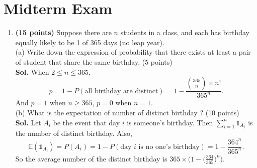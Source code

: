 \section*{Midterm Exam}
\begin{enumerate}
    \item \textbf{(15 points)} Suppose there are \(n\) students in a class, and each has birthday equally likely to be 1 of 365 days (no leap year).\\
    (a) Write down the expression of probability that there exists at least a pair of student that share the same birthday. (5 points)\\
    \textbf{Sol.} When $2\leq n\leq 365$,
\begin{equation*}    
    p=1-P(\text{all birthday are distinct})=1-\frac{\binom{365}{n}\times n!}{365^n}.
    \end{equation*}
    And $p=1$ when $n\geq 365$, $p=0$ when $n=1$.
    \\
    (b) What is the expectation of number of distinct birthday ? (10 points)\\
    \textbf{Sol.} Let $A_i$ be the event that day $i$ is someone's birthday. Then $\sum_{i=1}^n\mathds{1}_{A_i}$ is the number of distinct birthday. Also,
\begin{equation*}    
\mathbb{E}(\mathds{1}_{A_i})=P(A_i)=1-P(\text{day $i$ is no one's birthday})=1-\frac{364^n}{365^n}.
\end{equation*}
So the average number of the distinct birthday is $365\times\big(1-\big(\frac{364}{365}\big)^n\big)$.


\end{enumerate}
